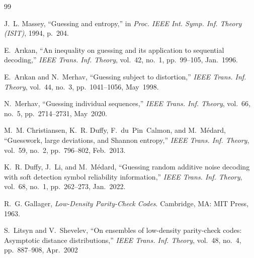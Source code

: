 \documentclass[journal,10pt,onecolumn]{IEEEtran}
\begin{document}
\begin{thebibliography}{99}

J.~L. Massey,
``Guessing and entropy,''
in \textit{Proc. IEEE Int. Symp. Inf. Theory (ISIT)}, 1994, p.~204.

E.~Ar{\i}kan,
``An inequality on guessing and its application to sequential decoding,''
\textit{IEEE Trans. Inf. Theory}, vol.~42, no.~1, pp.~99--105, Jan.~1996.

E.~Ar{\i}kan and N.~Merhav,
``Guessing subject to distortion,''
\textit{IEEE Trans. Inf. Theory}, vol.~44, no.~3, pp.~1041--1056, May~1998.

N.~Merhav,
``Guessing individual sequences,''
\textit{IEEE Trans. Inf. Theory}, vol.~66, no.~5, pp.~2714--2731, May~2020.

M.~M. Christiansen, K.~R. Duffy, F.~du~Pin~Calmon, and M.~M\'{e}dard,
``Guesswork, large deviations, and Shannon entropy,''
\textit{IEEE Trans. Inf. Theory}, vol.~59, no.~2, pp.~796--802, Feb.~2013.

K.~R. Duffy, J.~Li, and M.~M\'{e}dard,
``Guessing random additive noise decoding with soft detection
symbol reliability information,''
\textit{IEEE Trans. Inf. Theory}, vol.~68, no.~1, pp.~262--273, Jan.~2022.


R.~G. Gallager,
\textit{Low-Density Parity-Check Codes}.
Cambridge, MA: MIT Press, 1963.

S.~Litsyn and V.~Shevelev,
``On ensembles of low-density parity-check codes: Asymptotic distance distributions,''
\textit{IEEE Trans. Inf. Theory}, vol.~48, no.~4, pp.~887--908, Apr.~2002


\end{thebibliography}
\end{document}
